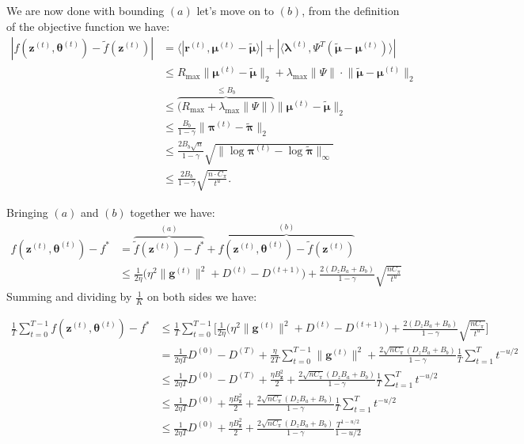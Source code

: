 We are now done with bounding $(a)$ let's move on to $(b)$, from the definition of the objective function we have:
\begin{align*}
    |f(\bm{z}^{(t)},\bm{\theta}^{(t)}) - \tilde{f}(\bm{z}^{(t)}) |
    &= \big\langle
    |\bm{r}^{(t)},
    \bm{\mu}^{(t)} - \tilde{\bm{\mu}}
    \big\rangle|
    + |\big\langle
    \bm{\lambda}^{(t)}, 
    \Psi^T(\tilde{\bm{\mu}}- \bm{\mu}^{(t)})
    \big\rangle|\\
    &\leq
    R_\text{max}
    \| \bm{\mu}^{(t)} - \tilde{\bm{\mu}} \|_2
    + \lambda_\text{max}
    \big\| \Psi \big\| \cdot 
    \big\| \tilde{\bm{\mu}}- \bm{\mu}^{(t)} \big\|_2\\
    &\leq
    \overbrace{\big(R_\text{max} + \lambda_\text{max}
    \big\| \Psi \big\| \big)}^{\leq B_b}
    \| \bm{\mu}^{(t)} - \tilde{\bm{\mu}} \|_2 \\
    &\leq \frac{B_b}{1-\gamma} \| \bm{\pi}^{(t)} - \tilde{\bm{\pi}} \|_2
    \\
    & \leq
    \frac{2 B_b \sqrt{n}}{1-\gamma}
    \sqrt{\| \log \bm{\pi}^{(t)} - \log \tilde{\bm{\pi}} \|_\infty} \\
    &\leq
    \frac{2 B_b}{1-\gamma}
    \sqrt{\frac{n \cdot C_\pi}{t^{u}}}. 
\end{align*}

Bringing $(a)$ and $(b)$ together we have:
\begin{align*}
    f(\bm{z}^{(t)},\bm{\theta}^{(t)}) - f^* &= 
    \overbrace{\tilde{f}(\bm{z}^{(t)}) - f^* }^{(a)}
    + \overbrace{f(\bm{z}^{(t)},\bm{\theta}^{(t)}) - \tilde{f}(\bm{z}^{(t)})}^{(b)}\\
    &\leq 
    \frac{1}{2\eta} \Big( 
         \eta^2\|\bm{g}^{(t)}\|^2
         + D^{(t)} - D^{(t+1)}
     \Big) 
     + \frac{2(D_z B_a+B_b)}{1 - \gamma} \sqrt{\frac{n C_\pi}{t^u}}
\end{align*}
Summing and dividing by $\frac{1}{K}$ on both sides we have:

\begin{align*}
    \frac{1}{T} \sum_{t=0}^{T-1} f(\bm{z}^{(t)},\bm{\theta}^{(t)}) - f^* 
    &\leq  \frac{1}{T} \sum_{t=0}^{T-1} \Bigg[ 
    \frac{1}{2\eta} \Big( 
         \eta^2\|\bm{g}^{(t)}\|^2
         + D^{(t)} - D^{(t+1)}
     \Big) 
     + \frac{2(D_z B_a+B_b)}{1 - \gamma} \sqrt{\frac{n C_\pi}{t^u}}
    \Bigg] \\
    &=   \frac{1}{2\eta T} D^{(0)} - D^{(T)}   
    +\frac{\eta}{2T} \sum_{t=0}^{T-1} 
         \|\bm{g}^{(t)}\|^2 
        + \frac{2 \sqrt{n C_\pi}  (D_z B_a+B_b)}{1 - \gamma}
        \frac{1}{T}\sum_{t=1}^{T} t^{-u/2}
        \\
    &\leq   \frac{1}{2\eta T} D^{(0)} - D^{(T)}   
    +\frac{\eta B_{\bm{z}}^2}{2} 
        + \frac{2 \sqrt{n C_\pi}  (D_z B_a+B_b)}{1 - \gamma}
        \frac{1}{T}\sum_{t=1}^{T} t^{-u/2} \\
    &\leq   \frac{1}{2\eta T} D^{(0)} 
    +\frac{\eta B_{\bm{z}}^2}{2} 
        + \frac{2 \sqrt{n C_\pi}  (D_z B_a+B_b)}{1 - \gamma}
        \frac{1}{T}\sum_{t=1}^{T} t^{-u/2}
        \\
        &\leq   \frac{1}{2\eta T} D^{(0)} 
        +\frac{\eta B_{\bm{z}}^2}{2} 
            + \frac{2 \sqrt{n C_\pi}  (D_z B_a+B_b)}{1 - \gamma}
            \frac{T^{1-u/2}}{1-u/2}
\end{align*}